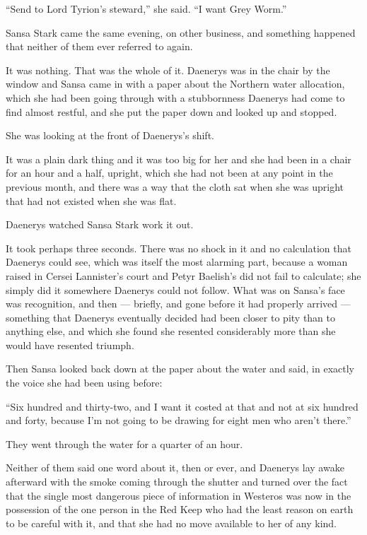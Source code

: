 “Send to Lord Tyrion’s steward,” she said. “I want Grey Worm.”

\sceneBreak

Sansa Stark came the same evening, on other business, and something happened that neither of them ever referred to again.

It was nothing. That was the whole of it. Daenerys was in the chair by the window and Sansa came in with a paper about the Northern water allocation, which she had been going through with a stubbornness Daenerys had come to find almost restful, and she put the paper down and looked up and stopped.

She was looking at the front of Daenerys’s shift.

It was a plain dark thing and it was too big for her and she had been in a chair for an hour and a half, upright, which she had not been at any point in the previous month, and there was a way that the cloth sat when she was upright that had not existed when she was flat.

Daenerys watched Sansa Stark work it out.

It took perhaps three seconds. There was no shock in it and no calculation that Daenerys could see, which was itself the most alarming part, because a woman raised in Cersei Lannister’s court and Petyr Baelish’s did not fail to calculate; she simply did it somewhere Daenerys could not follow. What was on Sansa’s face was recognition, and then — briefly, and gone before it had properly arrived — something that Daenerys eventually decided had been closer to pity than to anything else, and which she found she resented considerably more than she would have resented triumph.

Then Sansa looked back down at the paper about the water and said, in exactly the voice she had been using before:

“Six hundred and thirty-two, and I want it costed at that and not at six hundred and forty, because I’m not going to be drawing for eight men who aren’t there.”

They went through the water for a quarter of an hour.

Neither of them said one word about it, then or ever, and Daenerys lay awake afterward with the smoke coming through the shutter and turned over the fact that the single most dangerous piece of information in Westeros was now in the possession of the one person in the Red Keep who had the least reason on earth to be careful with it, and that she had no move available to her of any kind.

